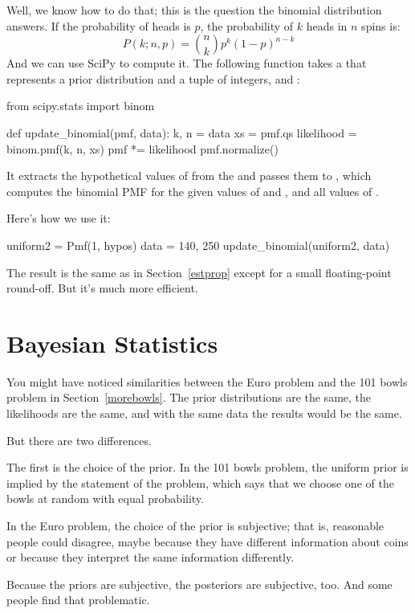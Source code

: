 \documentclass[12pt]{book}
\theoremstyle{exercise}
\begin{document}
Well, we know how to do that; this is the question the binomial distribution answers.
If the probability of heads is $p$, the probability of $k$ heads in $n$ spins is:
%
\[ P(k; n, p) = \binom{n}{k} p^k (1-p)^{n-k} \]
%
And we can use SciPy to compute it.
The following function takes a  that represents a prior distribution and a tuple of integers,  and :

\begin{code}
from scipy.stats import binom

def update_binomial(pmf, data):
    k, n = data
    xs = pmf.qs
    likelihood = binom.pmf(k, n, xs)
    pmf *= likelihood
    pmf.normalize()
\end{code}

It extracts the hypothetical values of  from the  and passes them to , which computes the binomial PMF for the given values of  and , and all values of .

Here's how we use it:

\begin{code}
uniform2 = Pmf(1, hypos)
data = 140, 250
update_binomial(uniform2, data)
\end{code}

The result is the same as in Section~\ref{estprop} except for a small floating-point round-off.
But it's much more efficient.


\section{Bayesian Statistics}

You might have noticed similarities between the Euro problem and the 101 bowls problem in Section~\ref{morebowls}.
The prior distributions are the same, the likelihoods are the same, and with the same data the results would be the same.

But there are two differences.

The first is the choice of the prior.
In the 101 bowls problem, the uniform prior is implied by the statement of the problem, which says that we choose one of the bowls at random with equal probability.

In the Euro problem, the choice of the prior is subjective; that is, reasonable people could disagree, maybe because they have different information about coins or because they interpret the same information differently.

Because the priors are subjective, the posteriors are subjective, too.
And some people find that problematic.
\end{document}

